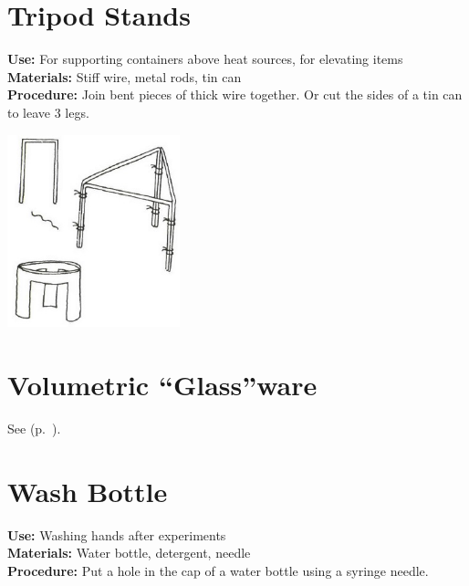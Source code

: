 \begin{multicols}{2}
\columnbreak

\section{Tripod Stands} 
\label{sec:tripod-stands}
\vspace{-10pt}
\textbf{Use:} For supporting containers above heat sources, for elevating items\\
\textbf{Materials:} Stiff wire, metal rods, tin can\\
\textbf{Procedure:} Join bent pieces of thick wire together. Or cut the sides of a tin can to leave 3 legs.
\begin{center}
\includegraphics[width=5cm]{./img/vso/tripod-stand.jpg}
\end{center}

\section{Volumetric ``Glass''ware} 
\label{sec:volumetric-glassware}
See  (p.~\pageref{sec:containers}).

\section{Wash Bottle} 
\label{sec:wash-bottle}
\vspace{-10pt}
\textbf{Use:} Washing hands after experiments\\
\textbf{Materials:} Water bottle, detergent, needle\\
\textbf{Procedure:} Put a hole in the cap of a water bottle using a syringe needle. 


\end{multicols}
